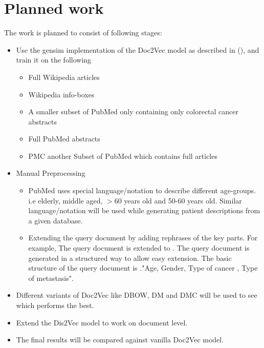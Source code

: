 \documentclass[12pt,a4paper] {article}
\begin{document}
\section*{Planned work} 
The work is planned to consist of following stages:
\begin{itemize}
	\item Use the gensim \cite{rehurek_lrec} implementation of the Doc2Vec model as described in (\cite{le2014distributed}), and train it on
	the following
	\begin{itemize}
		\item Full Wikipedia articles 
		\item Wikipedia info-boxes
		\item A smaller subset of PubMed only containing only  colorectal cancer abstracts
		\item Full PubMed abstracts
		\item PMC another Subset of PubMed which contains full articles
	\end{itemize}
	
	
	\item Manual Preprocessing
	\begin{itemize}
			\item PubMed uses special language/notation to describe different age-groups. i.e elderly, middle aged, $>$60 years old and 50-60 years old. Similar language/notation will be used while generating patient descriptions from a given database.
			
			\item Extending the query document by adding rephrases of the key parts. For example, The query document  is extended to . The query document is generated in a structured way to allow easy extension. The basic structure of the query document is ."Age, Gender, Type of cancer , Type of metastasis". 
		
	\end{itemize}
	\item Different variants of Doc2Vec like DBOW, DM and DMC will be used to see which performs the best.
  
	
	\item Extend the Dis2Vec \cite{ghosh2016characterizing} model to work on document level.
	\item The final results will be compared against vanilla Doc2Vec model.
	
	
\end{itemize}
\end{document}
